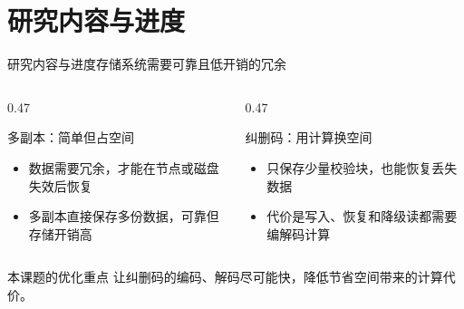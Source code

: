 
\section{研究内容与进度}

\begin{frame}{研究内容与进度}{存储系统需要可靠且低开销的冗余}

    \begin{columns}[T,onlytextwidth]
        \begin{column}{0.47\textwidth}
            \begin{block}{多副本：简单但占空间}
                \footnotesize
                \begin{itemize}
                    \setlength{\itemsep}{4pt}
                    \item 数据需要冗余，才能在节点或磁盘失效后恢复
                    \item 多副本直接保存多份数据，可靠但存储开销高
                \end{itemize}
            \end{block}
        \end{column}

        \begin{column}{0.47\textwidth}
            \begin{block}{纠删码：用计算换空间}
                \footnotesize
                \begin{itemize}
                    \setlength{\itemsep}{4pt}
                    \item 只保存少量校验块，也能恢复丢失数据
                    \item 代价是写入、恢复和降级读都需要编解码计算
                \end{itemize}
            \end{block}
        \end{column}
    \end{columns}

    \vspace{0.7em}
    \begin{block}{本课题的优化重点}
        \centering
        \footnotesize
        让纠删码的编码、解码尽可能快，降低节省空间带来的计算代价。
    \end{block}

\end{frame}

